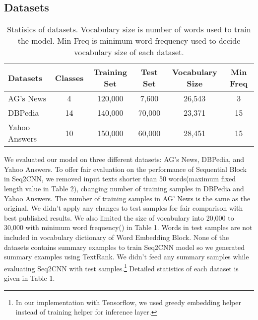 \documentclass{article}
\begin{document}
\subsection{Datasets}
\begin{table}[!ht]
  \caption{Statisics of datasets. Vocabulary size is number of words used to train the model. Min Freq is minimum word frequency  used to decide vocabulary size of each dataset.}
  \label{table1}
  \centering
  \begin{tabular}{lccccc}
    \toprule
    Datasets & Classes& Training Set&Test Set & Vocabulary Size& Min Freq\\
    \midrule
   AG's News &4  &120,000 &7,600  &26,543 &3  \\
    DBPedia  &14 &140,000 &70,000 &23,371 &15 \\
    Yahoo Answers &10 &150,000 & 60,000  &28,451 &15  \\
    \bottomrule
  \end{tabular}
\end{table}
We evaluated our model on three different datasets: AG's News, DBPedia, and Yahoo Answers\cite{DBLP:journals/corr/ZhangZL15}. To offer fair evaluation on the performance of Sequential Block in Seq2CNN, we removed input texts shorter than 50 words(maximum fixed length value in Table 2), changing number of training samples in DBPedia and Yahoo Answers. The number of training samples in AG' News is the same as the original. We didn't apply any changes to test samples for fair comparison with best published results. We also limited the size of vocabulary into 20,000 to 30,000 with minimum word frequency() in Table 1. Words in test samples are not included in vocabulary dictionary of Word Embedding Block. None of the datasets contains summary examples to train Seq2CNN model so we generated summary examples using TextRank\cite{mihalcea-tarau:2004:EMNLP}. We didn't feed any summary samples while evaluating Seq2CNN with test samples.\footnote{In our implementation with Tensorflow, we used greedy embedding helper instead of training helper for inference layer.}  Detailed statistics of each dataset is given in Table 1. 
\end{document}
